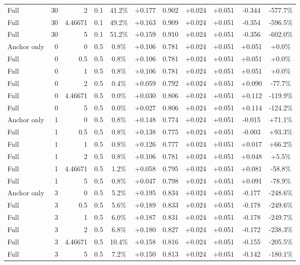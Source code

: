 \begin{table}[htbp]
\begin{tabular}{lrrrccccccc}
Full & 30 & 2 & 0.1 & 41.2\% & +0.177 & 0.902 & +0.024 & +0.051 & -0.344 & -577.7\% \\
Full & 30 & 4.46671 & 0.1 & 49.2\% & +0.163 & 0.909 & +0.024 & +0.051 & -0.354 & -596.5\% \\
Full & 30 & 5 & 0.1 & 51.2\% & +0.159 & 0.910 & +0.024 & +0.051 & -0.356 & -602.0\% \\
Anchor only & 0 & 0 & 0.5 & 0.8\% & +0.106 & 0.781 & +0.024 & +0.051 & +0.051 & +0.0\% \\
Full & 0 & 0.5 & 0.5 & 0.8\% & +0.106 & 0.781 & +0.024 & +0.051 & +0.051 & +0.0\% \\
Full & 0 & 1 & 0.5 & 0.8\% & +0.106 & 0.781 & +0.024 & +0.051 & +0.051 & +0.0\% \\
Full & 0 & 2 & 0.5 & 0.4\% & +0.059 & 0.792 & +0.024 & +0.051 & +0.090 & -77.7\% \\
Full & 0 & 4.46671 & 0.5 & 0.0\% & +0.030 & 0.806 & +0.024 & +0.051 & +0.112 & -119.9\% \\
Full & 0 & 5 & 0.5 & 0.0\% & +0.027 & 0.806 & +0.024 & +0.051 & +0.114 & -124.2\% \\
Anchor only & 1 & 0 & 0.5 & 0.8\% & +0.148 & 0.774 & +0.024 & +0.051 & -0.015 & +71.1\% \\
Full & 1 & 0.5 & 0.5 & 0.8\% & +0.138 & 0.775 & +0.024 & +0.051 & -0.003 & +93.3\% \\
Full & 1 & 1 & 0.5 & 0.8\% & +0.126 & 0.777 & +0.024 & +0.051 & +0.017 & +66.2\% \\
Full & 1 & 2 & 0.5 & 0.8\% & +0.106 & 0.781 & +0.024 & +0.051 & +0.048 & +5.5\% \\
Full & 1 & 4.46671 & 0.5 & 1.2\% & +0.058 & 0.795 & +0.024 & +0.051 & +0.081 & -58.8\% \\
Full & 1 & 5 & 0.5 & 0.8\% & +0.047 & 0.798 & +0.024 & +0.051 & +0.091 & -78.9\% \\
Anchor only & 3 & 0 & 0.5 & 5.2\% & +0.195 & 0.834 & +0.024 & +0.051 & -0.177 & -248.6\% \\
Full & 3 & 0.5 & 0.5 & 5.6\% & +0.189 & 0.833 & +0.024 & +0.051 & -0.178 & -249.6\% \\
Full & 3 & 1 & 0.5 & 6.0\% & +0.187 & 0.831 & +0.024 & +0.051 & -0.178 & -249.7\% \\
Full & 3 & 2 & 0.5 & 6.8\% & +0.180 & 0.827 & +0.024 & +0.051 & -0.172 & -238.3\% \\
Full & 3 & 4.46671 & 0.5 & 10.4\% & +0.158 & 0.816 & +0.024 & +0.051 & -0.155 & -205.5\% \\
Full & 3 & 5 & 0.5 & 7.2\% & +0.150 & 0.813 & +0.024 & +0.051 & -0.142 & -180.1\% \\

\end{tabular}
\end{table}
